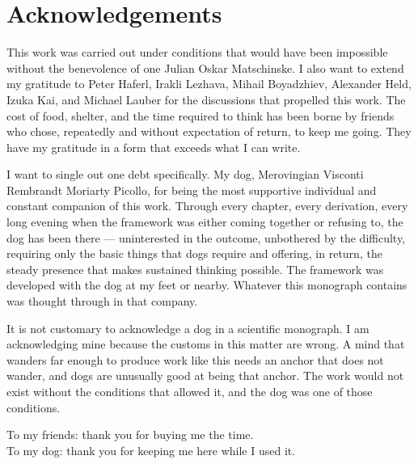 
\chapter*{Acknowledgements}

This work was carried out under conditions that would have been impossible
without the benevolence of one Julian Oskar Matschinske. I also want to extend
my gratitude to Peter Haferl, Irakli Lezhava, Mihail Boyadzhiev, Alexander
Held, Izuka Kai, and Michael Lauber for the discussions that propelled this
work. The cost of food, shelter, and the time required to think has been borne
by friends who chose, repeatedly and without expectation of return, to keep me
going. They have my gratitude in a form that exceeds what I can write.

I want to single out one debt specifically. My dog, Merovingian Visconti
Rembrandt Moriarty Picollo, for being the most supportive individual and
constant companion of this work. Through every chapter, every derivation, every
long evening when the framework was either coming together or refusing to, the
dog has been there --- uninterested in the outcome, unbothered by the
difficulty, requiring only the basic things that dogs require and offering, in
return, the steady presence that makes sustained thinking possible. The
framework was developed with the dog at my feet or nearby. Whatever this
monograph contains was thought through in that company.

It is not customary to acknowledge a dog in a scientific monograph. I am
acknowledging mine because the customs in this matter are wrong. A mind that
wanders far enough to produce work like this needs an anchor that does not
wander, and dogs are unusually good at being that anchor. The work would not
exist without the conditions that allowed it, and the dog was one of those
conditions.

\bigskip
\noindent
To my friends: thank you for buying me the time.\\
To my dog: thank you for keeping me here while I used it.
